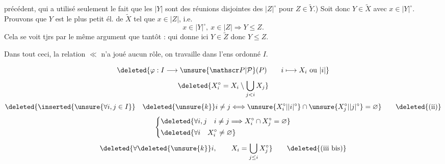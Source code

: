 
précédent, qui a utilisé seulement le fait que les $|Y|$ sont des réunions disjointes des $|Z|^{\circ}$ pour $Z\in\widetilde Y$.) 
Soit donc $Y\in\widetilde X$ avec $x\in|Y|^{\circ}$. Prouvons que $Y$ est le plus petit él. de $\widetilde X$ tel que $x\in|Z|$, i.e.
\[
x\in|Y|^{\circ},\ x\in|Z|\Longrightarrow Y\leq Z.
\]
Cela se voit tjrs par le même argument que tantôt : qui donne ici $Y\in\widetilde Z$ donc $Y\leq Z$.

Dans tout ceci, la relation $\ll$ n'a joué aucun rôle, on travaille dans l'ens ordonné $I$.

\[
\deleted{\varphi:I\longrightarrow\unsure{\mathscr P|\mathcal P}(P)\qquad i\longmapsto X_i\text{ ou }|i|}
\]
\[
\deleted{X_i^{\circ}=X_i\setminus\bigcup_{j<i}X_j}
\]
\[
\deleted{\inserted{\unsure{\forall i,j\in I}}\quad \deleted{\unsure{k}}i\ne j\Longleftrightarrow
\unsure{X_i^{\circ}|\lvert i\rvert^{\circ}}\cap\unsure{X_j^{\circ}|\lvert j\rvert^{\circ}}=\varnothing}\tag*{\deleted{(ii)}}
\]
\[
\left\{\begin{aligned}
&\deleted{\forall i,j\quad i\ne j\Longrightarrow X_i^{\circ}\cap X_j^{\circ}=\varnothing}\\
&\deleted{\forall i\quad X_i^{\circ}\ne\varnothing}
\end{aligned}\right.
\]
\[
\deleted{\forall\deleted{\unsure{k}}i,\qquad X_i=\bigcup_{j\leq i}X_j^{\circ}}\tag*{\deleted{(iii bis)}}
\]
